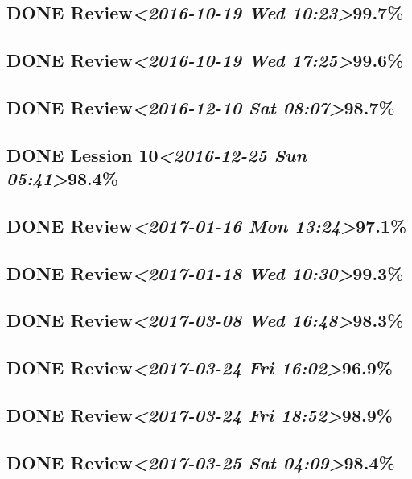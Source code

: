 \documentclass[11pt]{ctexart}
\begin{document}
\subsection{{\bfseries\sffamily DONE} Review\textit{<2016-10-19 Wed 10:23>}99.7\%}
\label{sec:org4fbe9b9}
\subsection{{\bfseries\sffamily DONE} Review\textit{<2016-10-19 Wed 17:25>}99.6\%}
\label{sec:org0d77f63}
\subsection{{\bfseries\sffamily DONE} Review\textit{<2016-12-10 Sat 08:07>}98.7\%}
\label{sec:org7acdece}
\subsection{{\bfseries\sffamily DONE} Lession 10\textit{<2016-12-25 Sun 05:41>}98.4\%}
\label{sec:org59c6bb6}

\subsection{{\bfseries\sffamily DONE} Review\textit{<2017-01-16 Mon 13:24>}97.1\%}
\label{sec:org93a418d}
\subsection{{\bfseries\sffamily DONE} Review\textit{<2017-01-18 Wed 10:30>}99.3\%}
\label{sec:orge88ec97}
\subsection{{\bfseries\sffamily DONE} Review\textit{<2017-03-08 Wed 16:48>}98.3\%}
\label{sec:org3010131}
\subsection{{\bfseries\sffamily DONE} Review\textit{<2017-03-24 Fri 16:02>}96.9\%}
\label{sec:org57c8ca4}
\subsection{{\bfseries\sffamily DONE} Review\textit{<2017-03-24 Fri 18:52>}98.9\%}
\label{sec:org714792e}
\subsection{{\bfseries\sffamily DONE} Review\textit{<2017-03-25 Sat 04:09>}98.4\%}
\label{sec:org9dd15c7}
\end{document}
